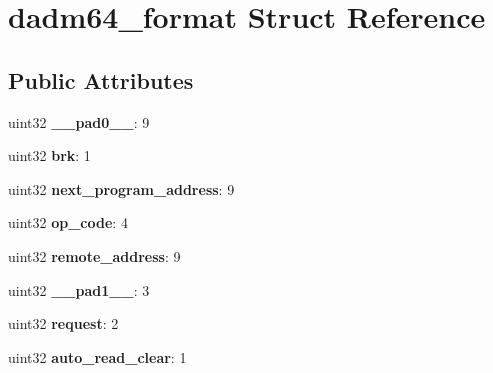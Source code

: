 \hypertarget{structdadm64__format}{}\section{dadm64\+\_\+format Struct Reference}
\label{structdadm64__format}
\subsection*{Public Attributes}
\begin{DoxyCompactItemize}
\item 
\mbox{\label{structdadm64__format_a03ab428a8ae9c51d844622abb24c2c67}} 
uint32 {\bfseries \+\_\+\+\_\+pad0\+\_\+\+\_\+}\+: 9
\item 
\mbox{\label{structdadm64__format_a1d3dccf5c5e176d9dcc011ef09b5ac07}} 
uint32 {\bfseries brk}\+: 1
\item 
\mbox{\label{structdadm64__format_a7b8daef7d17089119d33338cf7c8d466}} 
uint32 {\bfseries next\+\_\+program\+\_\+address}\+: 9
\item 
\mbox{\label{structdadm64__format_abf50ac3879bce85b602f74d5ac483722}} 
uint32 {\bfseries op\+\_\+code}\+: 4
\item 
\mbox{\label{structdadm64__format_aa6dbcfa3208da9893850e4700dc0a3e0}} 
uint32 {\bfseries remote\+\_\+address}\+: 9
\item 
\mbox{\label{structdadm64__format_ad106cf0f934bf771bfec930d05505e9e}} 
uint32 {\bfseries \+\_\+\+\_\+pad1\+\_\+\+\_\+}\+: 3
\item 
\mbox{\label{structdadm64__format_a9b996c4c77ec7c6c9e96d6163d00778b}} 
uint32 {\bfseries request}\+: 2
\item 
\mbox{\label{structdadm64__format_a0eb5e067a67f675622266e76a4673c3d}} 
uint32 {\bfseries auto\+\_\+read\+\_\+clear}\+: 1
\item 
\mbox{\label{structdadm64__format_a64d0a483bfbae3c708c9cc9cbb181a73}} 

\end{DoxyCompactItemize}
